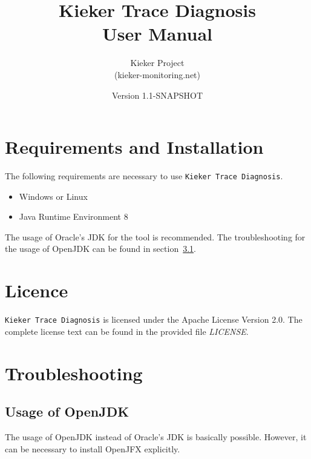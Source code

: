 \documentclass{article}
\title{Kieker Trace Diagnosis\\User Manual}
\date{Version 1.1-SNAPSHOT}
\author{Kieker Project\\(kieker-monitoring.net)}
\begin{document}
  \newcommand{\KiekerTraceDiagnosis}[0]{\texttt{Kieker Trace Diagnosis}}
  \newcommand{\file}[1]{\textit{#1}}

  \maketitle

  \section{Requirements and Installation}
  The following requirements are necessary to use \KiekerTraceDiagnosis{}.
  \begin{itemize}
    \item Windows or Linux
    \item Java Runtime Environment 8
  \end{itemize}
  The usage of Oracle's JDK for the tool is recommended. The troubleshooting for the usage of OpenJDK can be found in section~\ref{OpenJDK}.

  \section{Licence}
  \KiekerTraceDiagnosis{} is licensed under the Apache License Version 2.0. The complete license text can be found in the provided file \file{LICENSE}.

  \section{Troubleshooting}

  \subsection{Usage of OpenJDK}\label{OpenJDK}
  The usage of OpenJDK instead of Oracle's JDK is basically possible. However, it can be necessary to install OpenJFX explicitly.
\end{document}
